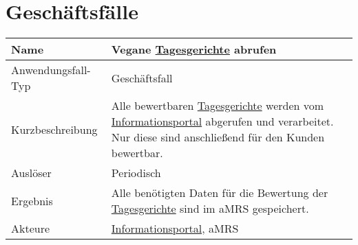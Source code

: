 \section{Geschäftsfälle}\label{sec:Geschaeftsfaelle}


\begin{table}[H]
    \centering
    \label{veganetagesgerichteabrufen}
    \begin{tabularx}{\textwidth}{| l | X |}
        \hline
        Name               & Vegane \hyperref[gls:tagesgericht]{Tagesgerichte} abrufen                                                                                                                                                     \\
        \hline
        Anwendungsfall-Typ & Geschäftsfall                                                                                                                                                                                                 \\
        \hline
        Kurzbeschreibung   & Alle bewertbaren \hyperref[gls:tagesgericht]{Tagesgerichte} werden vom \hyperref[gls:informationsportal]{Informationsportal} abgerufen und verarbeitet. Nur diese sind anschließend für den Kunden bewertbar. \\
        \hline
        Auslöser           & Periodisch                                                                                                                                                                                                    \\
        \hline
        Ergebnis           & Alle benötigten Daten für die Bewertung der \hyperref[gls:tagesgericht]{Tagesgerichte} sind im aMRS gespeichert.                                                                                              \\
        \hline
        Akteure            & \hyperref[gls:informationsportal]{Informationsportal}, \ac{aMRS}                                                                                                                                              \\
        \hline
    \end{tabularx}
\end{table}



